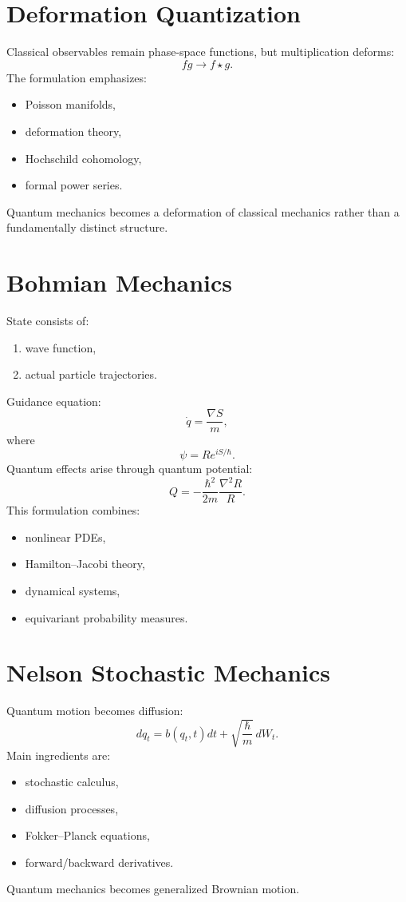 \section{Deformation Quantization}
\label{qmf:dq}
Classical observables remain phase-space functions, but multiplication deforms:
\[fg\rightarrow f\star g.\]
The formulation emphasizes:
\begin{itemize}
\item Poisson manifolds,
\item deformation theory,
\item Hochschild cohomology,
\item formal power series.
\end{itemize}
Quantum mechanics becomes a deformation of classical mechanics rather than a fundamentally distinct structure.
\section{Bohmian Mechanics}
\label{qmf:bm}
State consists of:
\begin{enumerate}
\item wave function,
\item actual particle trajectories.
\end{enumerate}
Guidance equation:
\[\dot q=\frac{\nabla S}{m},\]
where
\[\psi = Re^{iS/\hbar}.\]
Quantum effects arise through quantum potential:
\[Q=-\frac{\hbar^2}{2m}\frac{\nabla^2R}{R}.\]
This formulation combines:
\begin{itemize}
\item nonlinear PDEs,
\item Hamilton--Jacobi theory,
\item dynamical systems,
\item equivariant probability measures.
\end{itemize}

\section{Nelson Stochastic Mechanics}
\label{qmf:nm}
Quantum motion becomes diffusion:
\[dq_t=b(q_t,t)dt+\sqrt{\frac{\hbar}{m}}\, dW_t.\]
Main ingredients are:
\begin{itemize}
\item stochastic calculus,
\item diffusion processes,
\item Fokker--Planck equations,
\item forward/backward derivatives.
\end{itemize}
Quantum mechanics becomes generalized Brownian motion.


